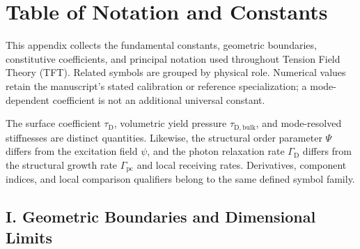 \chapter*{Table of Notation and Constants}
\label{app:notation}

This appendix collects the fundamental constants, geometric boundaries, constitutive coefficients, and principal notation used throughout Tension Field Theory (TFT). Related symbols are grouped by physical role. Numerical values retain the manuscript's stated calibration or reference specialization; a mode-dependent coefficient is not an additional universal constant.

The surface coefficient $\tau_{\mathrm D}$, volumetric yield pressure $\tau_{\mathrm{D,bulk}}$, and mode-resolved stiffnesses are distinct quantities. Likewise, the structural order parameter $\Psi$ differs from the excitation field $\psi$, and the photon relaxation rate $\Gamma_{\mathrm D}$ differs from the structural growth rate $\Gamma_{\mathrm{pc}}$ and local receiving rates. Derivatives, component indices, and local comparison qualifiers belong to the same defined symbol family.

\section*{I. Geometric Boundaries and Dimensional Limits}


